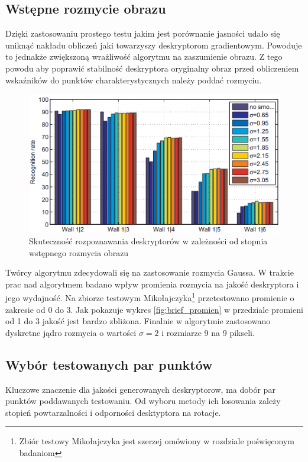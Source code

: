 \subsection{Wstępne rozmycie obrazu}
Dzięki zastosowaniu prostego testu jakim jest porównanie jasności udało się uniknąć nakładu obliczeń jaki towarzyszy deskryptorom gradientowym. Powoduje to jednakże zwiększoną wrażliwość algorytmu na zaszumienie obrazu. Z tego powodu aby poprawić stabilność deskryptora oryginalny obraz przed obliczeniem wskaźników do punktów charakterystycznych należy poddać rozmyciu. 

\begin{figure}
\centering
\includegraphics[scale=1]{pict/02/brief/sigma_comp.png}
\caption{Skuteczność rozpoznawania deskryptorów w zależności od stopnia wstępnego rozmycia obrazu}
\label{fig:brief_sigma_comp}
\end{figure}


Twórcy algorytmu zdecydowali się na zastosowanie rozmycia Gaussa. W trakcie prac nad algorytmem badano wpływ promienia rozmycia na jakość deskryptora i jego wydajność. Na zbiorze testowym Mikołajczyka\footnote{Zbiór testowy Mikołajczyka jest szerzej omówiony w rozdziale poświęconym badaniom} przetestowano promienie o zakresie od 0 do 3. Jak pokazuje wykres \ref{fig:brief_promien} w przedziale promieni od 1 do 3 jakość jest bardzo zbliżona. Finalnie w algorytmie zastosowano dyskretne jądro rozmycia o wartości $\sigma = 2 $ i rozmiarze 9 na 9 pikseli.

\subsection{Wybór testowanych par punktów}
Kluczowe znaczenie dla jakości generowanych deskryptorow, ma dobór par punktów poddawanych testowaniu. Od wyboru metody ich losowania zależy stopień powtarzalności i odporności desktyptora na rotacje. 

